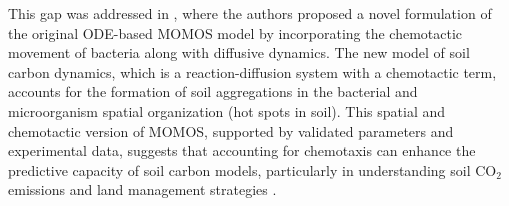 \documentclass{article}
\begin{document}
This gap was addressed in \cite{hammoudi2018mathematical}, where the authors proposed a novel formulation of the original ODE-based MOMOS model \cite{pansu2010modeling} by incorporating the chemotactic movement of bacteria along with diffusive dynamics. The new model of soil carbon dynamics, which is a reaction-diffusion system with a chemotactic term, accounts for the formation of soil aggregations in the bacterial and microorganism spatial organization (hot spots in soil). This spatial and chemotactic version of MOMOS, supported by validated parameters and experimental data, suggests that accounting for chemotaxis can enhance the predictive capacity of soil carbon models, particularly in understanding soil CO$_2$ emissions and land management strategies \cite{del2005modeling}.

\end{document}
